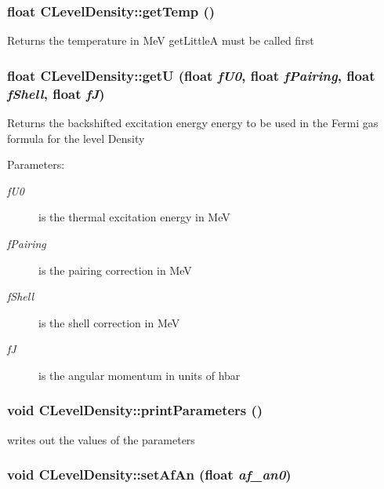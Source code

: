 \subsubsection{\setlength{\rightskip}{0pt plus 5cm}float CLevel\-Density::get\-Temp ()}\label{classCLevelDensity_e6c46c1ad332b9588dd9bb19f3d2d4b9}


Returns the temperature in Me\-V get\-Little\-A must be called first 
\subsubsection{\setlength{\rightskip}{0pt plus 5cm}float CLevel\-Density::get\-U (float {\em f\-U0}, float {\em f\-Pairing}, float {\em f\-Shell}, float {\em f\-J})}\label{classCLevelDensity_53f60b840003657ed59e12b9f2815451}


Returns the backshifted excitation energy energy to be used in the Fermi gas formula for the level Density \begin{Desc}
\item[Parameters:]
\begin{description}
\item[{\em f\-U0}]is the thermal excitation energy in Me\-V \item[{\em f\-Pairing}]is the pairing correction in Me\-V \item[{\em f\-Shell}]is the shell correction in Me\-V \item[{\em f\-J}]is the angular momentum in units of hbar \end{description}
\end{Desc}
\subsubsection{\setlength{\rightskip}{0pt plus 5cm}void CLevel\-Density::print\-Parameters ()\hspace{0.3cm}{\tt  [static]}}\label{classCLevelDensity_36a2a7b8bed24bcff27e47c51cc2134d}


writes out the values of the parameters 
\subsubsection{\setlength{\rightskip}{0pt plus 5cm}void CLevel\-Density::set\-Af\-An (float {\em af\_\-an0})\hspace{0.3cm}{\tt  [static]}}\label{classCLevelDensity_cc0135aa7baed8b5748e0bff737f9502}


